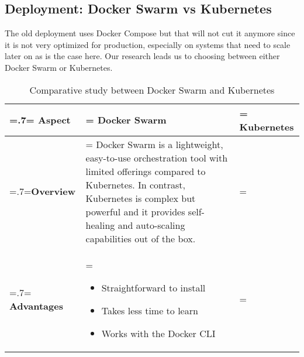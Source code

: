 \subsection{Deployment: Docker Swarm vs Kubernetes}
The old deployment uses Docker Compose but that will not cut it anymore since it is not very optimized for production, especially on systems that need to scale later on as is the case here.
Our research leads us to choosing between either Docker Swarm or Kubernetes.

\begin{table}[H]
    \renewcommand{\arraystretch}{1.5}%
    \caption{Comparative study between Docker Swarm and Kubernetes}
    \centering
    \medskip
    \begin{tabularx}{1\textwidth} {
            | >{\hsize=.7\hsize\linewidth=\hsize\centering\arraybackslash}X
            | >{\hsize=1.15\hsize\linewidth=\hsize\justifying\arraybackslash}X
            | >{\hsize=1.15\hsize\linewidth=\hsize\justifying\arraybackslash}X |}
        \hline
        \rowcolor{primary} \textbf {Aspect} & \textbf{Docker Swarm}                                                                                                                                                                                                                                                              & \textbf{Kubernetes}                                                      \\
        \hline
        \textbf {Overview}                  & \multicolumn{2}{|>{\hsize=2.35\hsize}X|} {Docker Swarm is a lightweight, easy-to-use orchestration tool with limited offerings compared to Kubernetes. In contrast, Kubernetes is complex but powerful and it provides self-healing and auto-scaling capabilities out of the box.}                                                                            \\
        \hline
        \textbf {Advantages}                & \begin{itemize}[leftmargin=*, topsep=0pt, itemsep=1pt, parsep=2pt]
            \item Straightforward to install
            \item Takes less time to learn
            \item Works with the Docker CLI
        \end{itemize}                                                                                                                                                                                                                                                          & \begin{itemize}[leftmargin=*, topsep=0pt, itemsep=1pt, parsep=2pt]

\end{itemize}
\end{tabularx}
\end{table}
